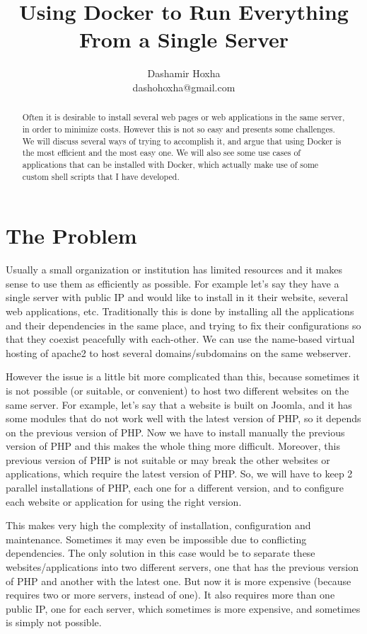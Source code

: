 \documentclass[a4paper]{article}
\title{Using Docker to Run Everything From a Single Server}
\author{Dashamir Hoxha \\ dashohoxha@gmail.com}
\begin{document}
\maketitle

\begin{abstract}

Often it is desirable to install several web pages or web applications
in the same server, in order to minimize costs. However this is not so
easy and presents some challenges.  We will discuss several ways of
trying to accomplish it, and argue that using Docker is the most
efficient and the most easy one. We will also see some use cases of
applications that can be installed with Docker, which actually make
use of some custom shell scripts that I have developed.

\end{abstract}
\vskip 32pt


\section{The Problem}

Usually a small organization or institution has limited resources and
it makes sense to use them as efficiently as possible. For example
let's say they have a single server with public IP and would like to
install in it their website, several web applications,
etc. Traditionally this is done by installing all the applications and
their dependencies in the same place, and trying to fix their
configurations so that they coexist peacefully with each-other. We can
use the name-based virtual hosting of apache2 to host several
domains/subdomains on the same webserver.

However the issue is a little bit more complicated than this, because
sometimes it is not possible (or suitable, or convenient) to host two
different websites on the same server. For example, let's say that a
website is built on Joomla, and it has some modules that do not work
well with the latest version of PHP, so it depends on the previous
version of PHP. Now we have to install manually the previous version
of PHP and this makes the whole thing more difficult. Moreover, this
previous version of PHP is not suitable or may break the other
websites or applications, which require the latest version of PHP. So,
we will have to keep 2 parallel installations of PHP, each one for a
different version, and to configure each website or application for
using the right version.

This makes very high the complexity of installation, configuration and
maintenance. Sometimes it may even be impossible due to conflicting
dependencies. The only solution in this case would be to separate
these websites/applications into two different servers, one that has
the previous version of PHP and another with the latest one. But now
it is more expensive (because requires two or more servers, instead of
one). It also requires more than one public IP, one for each server,
which sometimes is more expensive, and sometimes is simply not
possible.
\end{document}
